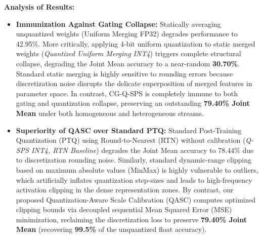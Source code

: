 \textbf{Analysis of Results:}
\begin{itemize}
  \item \textbf{Immunization Against Gating Collapse:} Statically averaging unquantized weights (Uniform Merging FP32) degrades performance to 42.95\%. More critically, applying 4-bit uniform quantization to static merged weights (\textit{Quantized Uniform Merging INT4}) triggers complete structural collapse, degrading the Joint Mean accuracy to a near-random \textbf{30.70\%}. Standard static merging is highly sensitive to rounding errors because discretization noise disrupts the delicate superposition of merged features in parameter space. In contrast, CG-Q-SPS is completely immune to both gating and quantization collapse, preserving an outstanding \textbf{79.40\% Joint Mean} under both homogeneous and heterogeneous streams.
  \item \textbf{Superiority of QASC over Standard PTQ:} Standard Post-Training Quantization (PTQ) using Round-to-Nearest (RTN) without calibration (\textit{Q-SPS INT4, RTN Baseline}) degrades the Joint Mean accuracy to 78.44\% due to discretization rounding noise. Similarly, standard dynamic-range clipping based on maximum absolute values (MinMax) is highly vulnerable to outliers, which artificially inflates quantization step-sizes and leads to high-frequency activation clipping in the dense representation zones. By contrast, our proposed Quantization-Aware Scale Calibration (QASC) computes optimized clipping bounds via decoupled sequential Mean Squared Error (MSE) minimization, reclaiming the discretization loss to preserve \textbf{79.40\% Joint Mean} (recovering \textbf{99.5\%} of the unquantized float accuracy).


\end{itemize}
